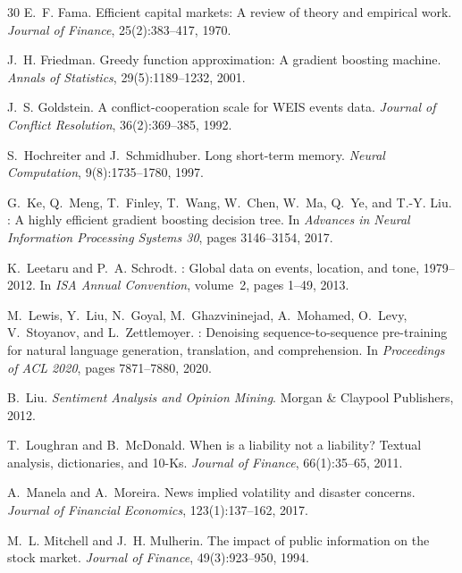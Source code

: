\documentclass[12pt,a4paper]{report}
\begin{document}
\begin{thebibliography}{30}
E.~F. Fama.
\newblock Efficient capital markets: A review of theory and empirical work.
\newblock \textit{Journal of Finance}, 25(2):383--417, 1970.

J.~H. Friedman.
\newblock Greedy function approximation: A gradient boosting machine.
\newblock \textit{Annals of Statistics}, 29(5):1189--1232, 2001.

J.~S. Goldstein.
\newblock A conflict-cooperation scale for {WEIS} events data.
\newblock \textit{Journal of Conflict Resolution}, 36(2):369--385, 1992.

S.~Hochreiter and J.~Schmidhuber.
\newblock Long short-term memory.
\newblock \textit{Neural Computation}, 9(8):1735--1780, 1997.

G.~Ke, Q.~Meng, T.~Finley, T.~Wang, W.~Chen, W.~Ma, Q.~Ye, and T.-Y. Liu.
: A highly efficient gradient boosting decision tree.
\newblock In \textit{Advances in Neural Information Processing Systems 30},
  pages 3146--3154, 2017.

K.~Leetaru and P.~A. Schrodt.
: Global data on events, location, and tone, 1979--2012.
\newblock In \textit{ISA Annual Convention}, volume~2, pages 1--49, 2013.

M.~Lewis, Y.~Liu, N.~Goyal, M.~Ghazvininejad, A.~Mohamed, O.~Levy,
  V.~Stoyanov, and L.~Zettlemoyer.
: Denoising sequence-to-sequence pre-training for natural
  language generation, translation, and comprehension.
\newblock In \textit{Proceedings of ACL 2020}, pages 7871--7880, 2020.

B.~Liu.
\newblock \textit{Sentiment Analysis and Opinion Mining}.
\newblock Morgan \& Claypool Publishers, 2012.

T.~Loughran and B.~McDonald.
\newblock When is a liability not a liability? {Textual} analysis,
  dictionaries, and 10-{Ks}.
\newblock \textit{Journal of Finance}, 66(1):35--65, 2011.

A.~Manela and A.~Moreira.
\newblock News implied volatility and disaster concerns.
\newblock \textit{Journal of Financial Economics}, 123(1):137--162, 2017.

M.~L. Mitchell and J.~H. Mulherin.
\newblock The impact of public information on the stock market.
\newblock \textit{Journal of Finance}, 49(3):923--950, 1994.


\end{thebibliography}
\end{document}
